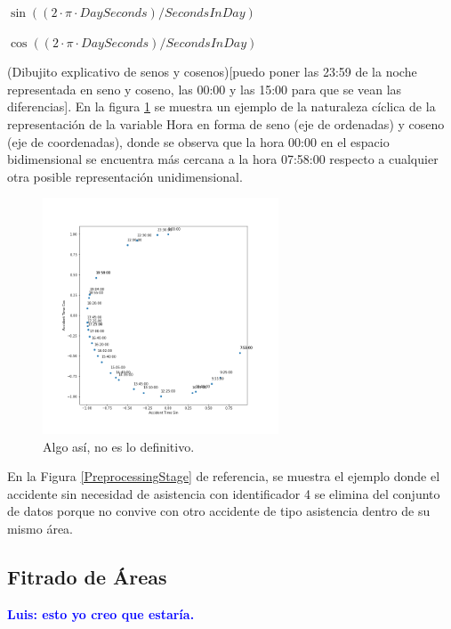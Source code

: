 \documentclass{uathesis-es}
\begin{document}
\begin{center}
    $\sin((2 \cdot \pi \cdot DaySeconds)/SecondsInDay)$
    
    $\cos((2 \cdot \pi \cdot DaySeconds)/SecondsInDay)$
\end{center}

(Dibujito explicativo de senos y cosenos)[puedo poner las 23:59 de la noche representada en seno y coseno, las 00:00 y las 15:00 para que se vean las diferencias]. En la figura \ref{HoursPlot} se muestra un ejemplo de la naturaleza cíclica de la representación de la variable Hora en forma de seno (eje de ordenadas) y coseno (eje de coordenadas), donde se observa que la hora 00:00 en el espacio bidimensional se encuentra más cercana a la hora 07:58:00 respecto a cualquier otra posible representación unidimensional.

\begin{figure}[H]
    \centering
    \includegraphics[width=7cm]{Figures/hours.png}
    \caption{Algo así, no es lo definitivo.}
    \label{HoursPlot}
\end{figure}

En la Figura \ref{PreprocessingStage} de referencia, se muestra el ejemplo donde el accidente sin necesidad de asistencia con identificador 4 se elimina del conjunto de datos porque no convive con otro accidente de tipo asistencia dentro de su mismo área.

\subsection{Fitrado de Áreas}

\textcolor{blue}{\textbf{Luis: esto yo creo que estaría.}}\\
\end{document}
